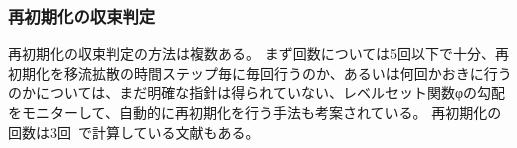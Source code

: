 \begin{comment}
式(\ref{CLSM-reinitialization})を弱形式で表すと、
\begin{equation}
\label{CLSM-weakform}
	\int_{\Omega} v \frac{\phi_c^{k+1}-\phi_c^k}{\Delta \tau} \mathrm{d} x-\int_{\Omega}\left(\frac{\phi_c^k+\phi_c^{k+1}}{2}-\phi_c^{k+1} \phi_c^k\right) \nabla v \cdot \hat{n}_*^{n+1}-\varepsilon \nabla\left(\frac{\phi_c^k+\phi_c^{k+1}}{2}\right) \cdot \hat{n}_*^{n+1}\left(\nabla v \cdot \hat{n}_*^{n+1}\right) \mathrm{d} x=0
\end{equation}

別の文献の式だとこのように書かれているが上と同じはず。
\begin{equation}
	\frac{1}{\Delta \tau}\left\langle\left(\phi^{n+1}-\phi^n\right), w\right\rangle-\frac{1}{2}\left\langle\nabla w,\left(\phi^{n+1}+\phi^n\right) \mathbf{n}_{\Gamma}\right\rangle+\left\langle\phi^{n+1} \phi^n \mathbf{n}_{\Gamma}, \nabla w\right\rangle +\frac{\varepsilon}{2}\left\langle\left(\nabla \phi^{n+1}+\nabla \phi^n\right) \cdot \mathbf{n}_{\Gamma}, \nabla w \cdot \mathbf{n}_{\Gamma}\right\rangle=0
\end{equation}

時間ステップは、
\begin{equation}
	\Delta \tau = \Delta x^{1+d} \beta
\end{equation}

インターフェース厚さは、
\begin{equation}
	\epsilon = \Delta x^{1-d} \beta
\end{equation}
ここで変数$\beta$は$0.5$が基本だが、気泡の問題などには薄い界面として0.5より小さい値を用いることも許容する。

式(\ref{CLSM-weakform})をマトリクス形式に変形すると

\subsubsection{高精度保存型レベルセット関数}
CLS関数ではレベルセット法の長所であった界面法線ベクトルや曲率の精度が低下する\cite{Nakazawa2023}
そこでAccurate Conservative LevelSet法(ACLS法)では関数から符号付距離関数$\phi$を再構築し、法線ベクトルや曲率を評価する方法である。
\end{comment}

\subsubsection{再初期化の収束判定}
再初期化の収束判定の方法は複数ある。
まず回数については5回以下で十分、再初期化を移流拡散の時間ステップ毎に毎回行うのか、あるいは何回かおきに行うのかについては、まだ明確な指針は得られていない、レベルセット関数φの勾配をモニターして、自動的に再初期化を行う手法も考案されている。\cite{Okano2016}
再初期化の回数は3回~\cite{Himeno1999}で計算している文献もある。


